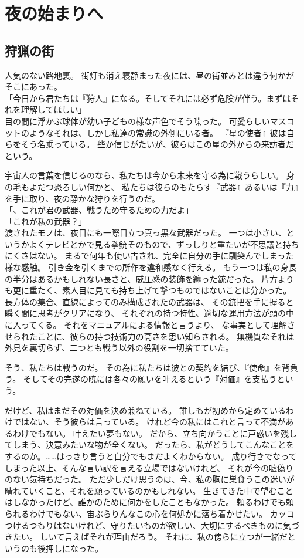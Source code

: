 \documentclass[autodetect-engine,dvipdfmx-if-dvi,a5paper,ja=standard,twoside,titlepage,final,twocolumn]{ltjtbook}
\begin{document}
\chapter{\rm 夜の始まりへ}
\section{\rm 狩猟の街}
人気のない路地裏。
街灯も消え寝静まった夜には、昼の街並みとは違う何かがそこにあった。\\
「今日から君たちは『狩人』になる。そしてそれには必ず危険が伴う。まずはそれを理解してほしい」\\
目の間に浮かぶ球体が幼い子どもの様な声色でそう喋った。
可愛らしいマスコットのようなそれは、しかし私達の常識の外側にいる者。
『星の使者』彼は自らをそう名乗っている。
些か信じがたいが、彼らはこの星の外からの来訪者だという。

宇宙人の言葉を信じるのなら、私たちは今から未来を守る為に戦うらしい。
身の毛もよだつ恐ろしい何かと、
私たちは彼らのもたらす『武器』あるいは『力』を手に取り、夜の静かな狩りを行うのだ。\\
「、これが君の武器、戦うため守るための力だよ」\\
「これが私の武器？」\\
渡されたモノは、夜目にも一際目立つ真っ黒な武器だった。
一つは小さい、というかよくテレビとかで見る拳銃そのもので、ずっしりと重たいが不思議と持ちにくさはない。
まるで何年も使い古され、完全に自分の手に馴染んでしまった様な感触。
引き金を引くまでの所作を違和感なく行える。
もう一つは私の身長の半分はあるかもしれない長さと、威圧感の装飾を纏った銃だった。
片方よりも更に重たく、素人目に見ても持ち上げて撃つものではないことは分かった。
長方体の集合、直線によってのみ構成されたの武器は、
その銃把を手に握ると瞬く間に思考がクリアになり、
それぞれの持つ特性、適切な運用方法が頭の中に入ってくる。
それをマニュアルによる情報と言うより、
な事実として理解させられたことに、彼らの持つ技術力の高さを思い知らされる。
無機質なそれは外見を裏切らず、二つとも戦う以外の役割を一切捨てていた。

そう、私たちは戦うのだ。
その為に私たちは彼との契約を結び、『使命』を背負う。
そしてその完遂の暁には各々の願いを叶えるという『対価』を支払うという。

だけど、私はまだその対価を決め兼ねている。
誰しもが初めから定めているわけではない、そう彼らは言っている。
けれど今の私にはこれと言って不満があるわけでもない。
叶えたい夢もない。
だから、立ち向かうことに戸惑いを残してしまう、決意みたいな物が全くない。
だったら、私がどうしてこんなことをするのか。……はっきり言うと自分でもまだよくわからない。
成り行きでなってしまった以上、そんな言い訳を言える立場ではないけれど、
それが今の嘘偽りのない気持ちだった。
ただ少しだけ思うのは、今、私の胸に巣食うこの迷いが晴れていくこと、それを願っているのかもしれない。
生きてきた中で望むことはしなかったけど、誰かのために何かをしたこともなかった。
頼るわけでも頼られるわけでもない、宙ぶらりんなこの心を何処かに落ち着かせたい。
カッコつけるつもりはないけれど、守りたいものが欲しい、大切にするべきものに気づきたい。
しいて言えばそれが理由だろう。
それに、私の傍らに立つが一緒だというのも後押しになった。
\end{document}
